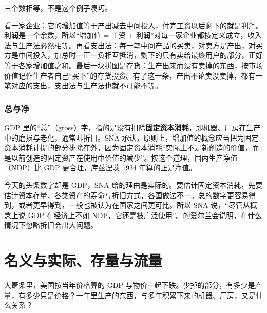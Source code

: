 
三个数相等，不是这个例子凑巧。

\begin{intuition}[为什么三种算法必然相等]
看一家企业：它的增加值等于产出减去中间投入，付完工资以后剩下的就是利润。利润是一个余数，所以“增加值 = 工资 + 利润”对每一家企业都按定义成立，收入法与生产法必然相等。再看支出法：每一笔中间产品的买卖，对卖方是产出，对买方是中间投入，加总时一正一负相互抵消，剩下的只有卖给最终用户的部分，正好等于各家增加值之和。最后一块拼图是存货：生产出来而没有卖掉的东西，按市场价值记作生产者自己“买下”的存货投资。有了这一条，产出不论卖没卖掉，都有一笔对应的支出，支出法与生产法也就不可能不等。
\end{intuition}

\subsubsection{总与净}
GDP 里的“总”（gross）字，指的是没有扣除\textbf{固定资本消耗}，即机器、厂房在生产中的磨损与老化，通常叫折旧。SNA 承认，原则上，增加值的概念应当把为固定资本消耗计提的部分排除在外，因为固定资本消耗“实际上不是新创造的价值，而是以前创造的固定资产在使用中价值的减少”\cite{sna2008}。按这个道理，国内生产净值（NDP）比 GDP 更合理，库兹涅茨 1934 年算的正是净值。

今天的头条数字却是 GDP，SNA 给的理由是实际的。要估计固定资本消耗，先要估计资本存量、各类资产的寿命与折旧方式，各国做法不一。总的数字更容易得到，或者更早得到，一般也被认为在国家之间更可比。所以 SNA 说，“尽管从概念上说 GDP 在经济上不如 NDP，它还是被广泛使用”\cite{sna2008}。的爱尔兰会说明，在什么情况下忽略折旧会出大问题。

\section{名义与实际、存量与流量}\label{sec:accounts-real}

大萧条里，美国按当年价格算的 GDP 与物价一起下跌。少掉的部分，有多少是产量，有多少只是价格？一年里生产的东西，与多年积累下来的机器、厂房，又是什么关系？

